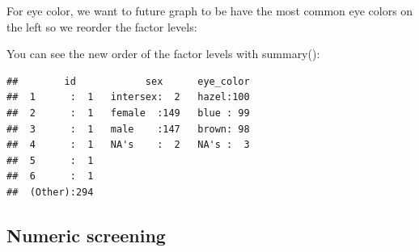\documentclass[
]{krantz}
\makeatletter
\newenvironment{Shaded}{\begin{snugshade}}{\end{snugshade}}
\newcommand{\DataTypeTok}[1]{\textcolor[rgb]{0.27,0.27,0.27}{#1}}
\newcommand{\KeywordTok}[1]{\textcolor[rgb]{0.27,0.27,0.27}{\textbf{#1}}}
\newcommand{\NormalTok}[1]{#1}
\newcommand{\OperatorTok}[1]{\textcolor[rgb]{0.43,0.43,0.43}{\textbf{#1}}}
\newcommand{\StringTok}[1]{\textcolor[rgb]{0.5,0.5,0.5}{#1}}
\newenvironment{kframe}{%
\medskip{}
\setlength{\fboxsep}{.8em}
 \def\at@end@of@kframe{}%
 \ifinner\ifhmode%
  \def\at@end@of@kframe{\end{minipage}}%
  \begin{minipage}{\columnwidth}%
 \fi\fi%
 \def\FrameCommand##1{\hskip\@totalleftmargin \hskip-\fboxsep
 \colorbox{shadecolor}{##1}\hskip-\fboxsep
     \hskip-\linewidth \hskip-\@totalleftmargin \hskip\columnwidth}%
 \MakeFramed {\advance\hsize-\width
   \@totalleftmargin\z@ \linewidth\hsize
   \@setminipage}}%
 {\par\unskip\endMakeFramed%
 \at@end@of@kframe}
\renewenvironment{Shaded}{\begin{kframe}}{\end{kframe}}
\makeatother
\begin{document}
\begin{Shaded}
\end{Shaded}

For eye color, we want to future graph to be have the most common eye colors on the left so we reorder the factor levels:

\begin{Shaded}
\end{Shaded}

You can see the new order of the factor levels with summary():

\begin{Shaded}
\end{Shaded}

\begin{verbatim}
##        id            sex      eye_color  
##  1      :  1   intersex:  2   hazel:100  
##  2      :  1   female  :149   blue : 99  
##  3      :  1   male    :147   brown: 98  
##  4      :  1   NA's    :  2   NA's :  3  
##  5      :  1                             
##  6      :  1                             
##  (Other):294
\end{verbatim}

\hypertarget{numeric-screening-4}{%
\subsection{Numeric screening}\label{numeric-screening-4}}
\end{document}
